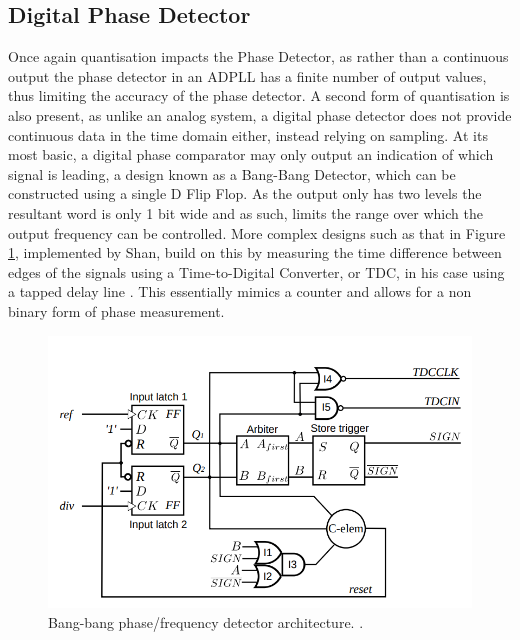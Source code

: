 \documentclass[11pt,english,british]{report}
\begin{document}
\subsection{Digital Phase Detector}
Once again quantisation impacts the Phase Detector, as rather than a continuous output the phase detector in an ADPLL has a finite number of output values, thus limiting the accuracy of the phase detector. A second form of quantisation is also present, as unlike an analog system, a digital phase detector does not provide continuous data in the time domain either, instead relying on sampling. At its most basic, a digital phase comparator may only output an indication of which signal is leading, a design known as a Bang-Bang Detector, which can be constructed using a single D Flip Flop. As the output only has two levels the resultant word is only 1 bit wide and as such, limits the range over which the output frequency can be controlled. More complex designs such as that in Figure \ref{fig:shan_bb_pd}, implemented by Shan, build on this by measuring the time difference between edges of the signals using a Time-to-Digital Converter, or TDC, in his case using a tapped delay line \cite{shan2014phd}. This essentially mimics a counter and allows for a non binary form of phase measurement.

\begin{figure}[h] %
	\centering
	\includegraphics[scale=0.35]{../shan_bb_pd}
	\caption{Bang-bang phase/frequency detector architecture. \cite{shan2014phd}.}
	\label{fig:shan_bb_pd}
\end{figure}
\end{document}
